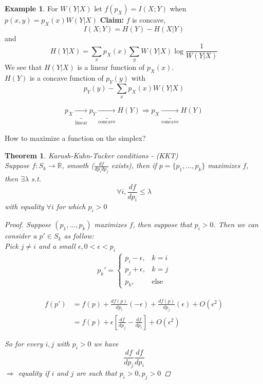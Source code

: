 \documentclass[twoside]{article}
\newtheorem{theorem}{Theorem}[section]
\theoremstyle{definition} %
\newtheorem{example}{Example}
\def\R{\mathbb{R}}
\begin{document}
\begin{appendices}
\begin{example}
  For $W(Y | X)$ let $f(p_X) = I(X ; Y)$ when $p(x, y) = p_X(x) W(Y | X) $
  \textbf{Claim:} $f$ is concave,
  \[ I(X ; Y) = H(Y) - H(X | Y) \]
  and
  \[ H(Y|X) = \sum_x p_X(x) \sum_y W(Y|X) \log \frac{1}{W(Y | X)} \]
  We see that $H(Y|X)$ is a linear function of $p_X(x)$.\\
  $H(Y)$ is a concave function of $p_Y(y)$ with
  \[ p_Y(y) - \sum_x p_X(x) W(Y|X) \]

  \begin{align*}
    p_X \underbrace{\longrightarrow}_{\text{linear}} p_Y \underbrace{\longrightarrow}_{\text{concave}} H(Y)
    \Longrightarrow p_X \underbrace{\longrightarrow}_{\text{concave}} H(Y)
  \end{align*}
\end{example}

How to maximize a function on the simplex?

\begin{theorem}{Karush-Kuhn-Tucker conditions - (KKT)} \\
  Suppose $f: S_k \rightarrow \R$, smooth ($\frac{df}{dp_i dp_j}$ exists), then if $p = \{ p_1, ..., p_k\}$ maximizes $f$, then $\exists \lambda$ s.t.
  \[ \forall i, \frac{df}{d p_i} \leq \lambda \]
  with equality $\forall i$ for which $p_i > 0$

\begin{proof}
  Suppose $(p_1, ..., p_k)$ maximizes $f$, then suppose that $p_i > 0$. Then we can consider a $p' \in S_k$ as follow:\\
  Pick $j \neq i$ and a small $\epsilon, 0 < \epsilon < p_i$
  \begin{align*}
    p_k' =
    \left\{
    \begin{array}{ll}
      p_i - \epsilon, &k = i \\
      p_j + \epsilon, & k = j \\
      p_k, &\text{else}
    \end{array}
    \right.
  \end{align*}

  \begin{align*}
    f(p') &= f(p) + \frac{d f(p)}{d p_i}(- \epsilon) + \frac{d f(p)}{d p_j} (\epsilon) + O(\epsilon^2) \\
    &= f(p) + \epsilon \left[ \frac{df}{dp_j} - \frac{df}{dp_i} \right] + O(\epsilon^2)
  \end{align*}

  So for every $i, j$ with $p_i > 0$ we have
  \[ \frac{df}{dp_j} \frac{df}{dp_i} \]
  $\Rightarrow$ equality if $i$ and $j$ are such that $p_i > 0, p_j > 0$


\end{proof}
\end{theorem}
\end{appendices}
\end{document}
